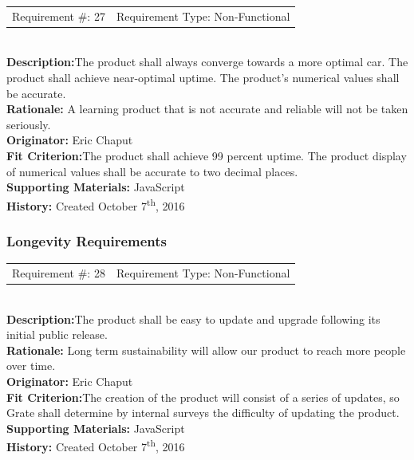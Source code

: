 \documentclass[12pt, titlepage]{article}
\begin{document}
\begin{reqbox}
%
\begin{tabular}{cc}
Requirement \#: 27 & Requirement Type: Non-Functional \\
\end{tabular} \\
%
\textbf{Description:}The product shall always converge towards a more optimal 
car. The product shall achieve near-optimal uptime. The product's numerical 
values shall be accurate.  \\
\textbf{Rationale:}  A learning product that is not accurate and reliable will 
not be taken seriously.\\
\textbf{Originator:} Eric Chaput\\
\textbf{Fit Criterion:}The product shall achieve 99 percent uptime. The product 
display of numerical values shall be accurate to two decimal places.\\
%  
\textbf{Supporting Materials:} JavaScript \\
\textbf{History:} Created October 7\textsuperscript{th}, 2016
%
\end{reqbox}

\newpage

\subsubsection{Longevity Requirements}

\begin{reqbox}
%
\begin{tabular}{cc}
Requirement \#: 28 & Requirement Type: Non-Functional \\
\end{tabular} \\
%
\textbf{Description:}The product shall be easy to update and upgrade following 
its initial public 
release.\\
\textbf{Rationale:}  Long term sustainability will allow our product to reach 
more people over time.\\
\textbf{Originator:} Eric Chaput\\
\textbf{Fit Criterion:}The creation of the product will consist of a series of 
updates, so Grate shall determine by internal surveys the difficulty of updating 
the product.\\
%  
\textbf{Supporting Materials:} JavaScript \\
\textbf{History:} Created October 7\textsuperscript{th}, 2016
%
\end{reqbox}
\end{document}
